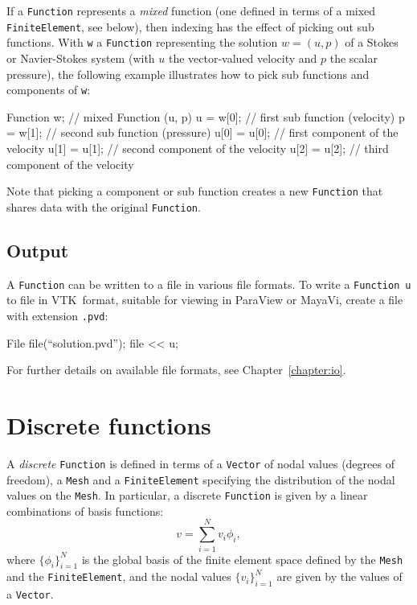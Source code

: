 If a \texttt{Function} represents a \emph{mixed} function (one defined in terms
of a mixed \texttt{FiniteElement}, see below), then indexing has the effect of
picking out sub functions. With \texttt{w} a \texttt{Function} representing the
solution $w = (u, p)$ of a Stokes or Navier-Stokes system (with $u$ the vector-valued
velocity and $p$ the scalar pressure), the following example illustrates how to
pick sub functions and components of \texttt{w}:
\begin{code}
  Function w;  // mixed Function (u, p)
  u = w[0];    // first sub function (velocity)
  p = w[1];    // second sub function (pressure)
  u[0] = u[0]; // first component of the velocity
  u[1] = u[1]; // second component of the velocity
  u[2] = u[2]; // third component of the velocity
\end{code}

Note that picking a component or sub function creates a new
\texttt{Function} that shares data with the original \texttt{Function}.

\subsection{Output}

A \texttt{Function} can be written to a file in various file formats.
To write a \texttt{Function}~\texttt{u} to file in VTK~format,
suitable for viewing in ParaView or MayaVi, create a file with
extension \texttt{.pvd}:
\begin{code}
  File file(``solution.pvd'');
  file << u;
\end{code}

For further details on available file formats, see
Chapter~\ref{chapter:io}.

\section{Discrete functions}

A \emph{discrete} \texttt{Function} is defined in terms of a \texttt{Vector} of nodal
values (degrees of freedom), a \texttt{Mesh} and
a \texttt{FiniteElement} specifying the distribution of the nodal values
on the \texttt{Mesh}. In particular, a discrete \texttt{Function}
is given by a linear combinations of basis functions:
\begin{equation}
  v = \sum_{i=1}^{N} v_i \phi_{i},
\end{equation}
where $\{\phi_i\}_{i=1}^N$ is the global basis of the finite element
space defined by the \texttt{Mesh} and the \texttt{FiniteElement}, and
the nodal values $\{v_i\}_{i=1}^N$ are given by the values of a
\texttt{Vector}.

